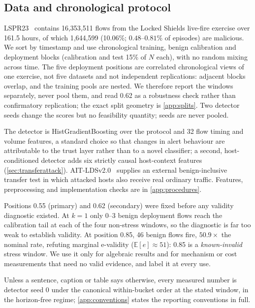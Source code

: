 \documentclass[conference]{IEEEtran}
\begin{document}
\subsection{Data and chronological protocol}\label{sec:data}

LSPR23~\cite{lspr23} contains 16,353,511 flows from the Locked Shields live-fire exercise over 161.5
hours, of which 1,644,599 (10.06\%; $0.48$--$0.81\%$ of episodes) are malicious. We sort by timestamp
and use chronological training, benign calibration and deployment blocks (calibration and test 15\% of
$N$ each), with no random mixing across time. The five deployment positions are correlated
chronological views of one exercise, not five datasets and not independent replications: adjacent
blocks overlap, and the training pools are nested. We therefore report the windows separately, never
pool them, and read 0.62 as a robustness check rather than confirmatory replication; the exact split
geometry is \cref{app:splits}. Two detector seeds change the scores but no feasibility quantity; seeds are never pooled.

The detector is HistGradientBoosting over the protocol and 32 flow timing and volume features, a
standard choice so that changes in alert behaviour are attributable to the trust layer rather than to a
novel classifier; a second, host-conditioned detector adds six strictly causal host-context features
(\cref{sec:transferattack}). AIT-LDSv2.0~\cite{aitlds} supplies an external
benign-inclusive transfer test in which attacked hosts also receive real ordinary traffic. Features,
preprocessing and implementation checks are in \cref{app:procedures}.

Positions 0.55 (primary) and 0.62 (secondary) were fixed before any validity diagnostic existed. At
$k=1$ only $0$--$3$ benign deployment flows reach the calibration tail at each of the four non-stress
windows, so the diagnostic is far too weak to establish validity. At position 0.85,
46 benign flows fire, $50.9\times$ the nominal rate, refuting marginal e-validity
($\mathbb E[e]\approx51$): 0.85 is a \emph{known-invalid} stress window. We use it only for algebraic
results and for mechanism or cost measurements that need no valid evidence, and label it at every use.

Unless a sentence, caption or table says otherwise, every measured number is detector seed 0 under the
canonical within-bucket order at the stated window, in the horizon-free regime; \cref{app:conventions}
states the reporting conventions in full.
\end{document}
